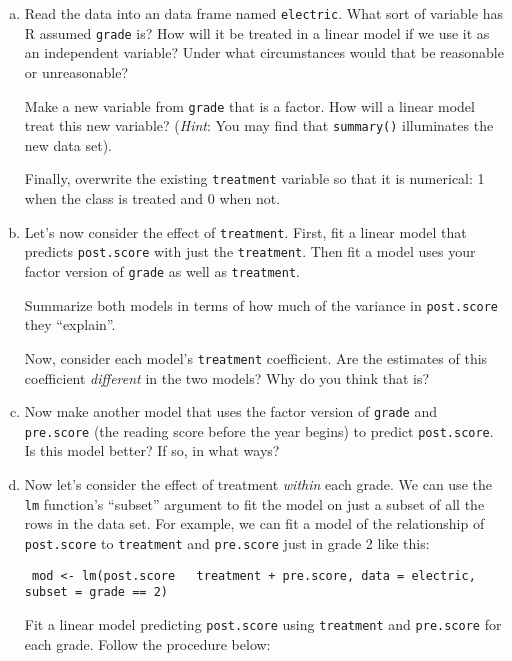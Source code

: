 \documentclass[11pt]{article}
\begin{document}
\vspace{1mm}  
\begin{enumerate}[a.]
	\item Read the data into an data frame named {\tt electric}. 
What sort of variable has R assumed {\tt grade} is? How will 
it be treated in a linear model if we use it as an independent variable? 
Under what circumstances would that be reasonable or unreasonable?

Make a new variable from {\tt grade} that is a factor. How will a 
linear model treat this new variable? (\textit{Hint}: You may 
find that {\tt summary()} illuminates the new data set).

Finally, overwrite the existing {\tt treatment} variable so that it is 
numerical: 1 when the class is treated and 0 when not.

\item Let's now consider the effect of {\tt treatment}. First, fit a linear model 
that predicts {\tt post.score} with just the {\tt treatment}. Then fit a model uses 
your factor version of {\tt grade} as well as {\tt treatment}.  

Summarize both models in terms of how much of the variance 
in {\tt post.score} they ``explain''. 

Now, consider each model's {\tt treatment} coefficient. 
Are the estimates of this coefficient 
\textit{different} in the two models? Why do you think that is?

\item Now make another model that uses the factor version of {\tt grade} and 
{\tt pre.score} (the reading score before the year begins) to predict 
{\tt post.score}.  Is this model better? If so, in what ways?

\item Now let's consider the effect of treatment \textit{within} each grade. 
We can use the {\tt lm} function's ``subset'' argument to fit the model on just a subset of all the rows in the data set. For example, we can fit a model 
of the relationship of {\tt post.score} to {\tt treatment} and {\tt pre.score} just in grade 2 like this:

\vspace{2mm}
{\tt 
mod <- lm(post.score ~ treatment + pre.score, data = electric, 
          subset = grade == 2)
}

\vspace{-2mm}
Fit a linear model predicting {\tt post.score} using {\tt treatment} and 
{\tt pre.score} for each 
grade. Follow the procedure below:



\end{enumerate}
\end{document}
